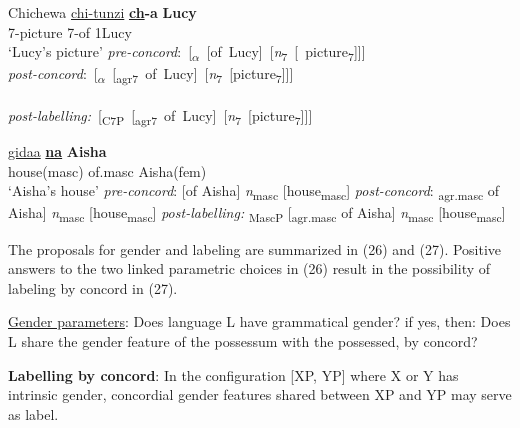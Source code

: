 \documentclass[output=paper
,modfonts
,nonflat]{langsci/langscibook}
\begin{document}
{\begin{exe} \settowidth{}
	\ex 
	\xlist
	\ex Chichewa \newline
	\gll \underline{chi-tunzi}    \textbf{\underline{ch}-a}  \textbf{Lucy} \\
	7-picture    7-of     1Lucy\\
	\glt `Lucy’s picture'  	
	\ex \mbox{\textit{pre-concord}:   [\textsubscript{$\alpha$} [of Lucy] [\textit{n}\textsubscript{7} [ picture\textsubscript{7}]]]}\\  
	\ex \mbox{\textit{post-concord}:   [\textsubscript{$\alpha$} [\textsubscript{agr7} of Lucy] [\textit{n}\textsubscript{7} [picture\textsubscript{7}]]]}\\  \\
	\ex \mbox{\textit{post-labelling:} [\textsubscript{C7P} [\textsubscript{agr7} of Lucy] [\textit{n}\textsubscript{7} [picture\textsubscript{7}]]]}\\ 
	\endxlist
\end{exe}
\begin{exe}
	\ex 
	\xlist
	\ex 
	\gll \underline{gidaa}    \textbf{\underline{na}}  \textbf{Aisha} \\
	house(masc)   of.masc   Aisha(fem)\\
	\glt `Aisha's house'  	
	\ex \textit{pre-concord}:   {\lbrack}[of Aisha] \textit{n}\textsubscript{masc} [house\textsubscript{masc}]{\rbrack}
	\ex \textit{post-concord}:   {\lbrack}\textsubscript{agr.masc} of Aisha] \textit{n}\textsubscript{masc} [house\textsubscript{masc}]{\rbrack}
	\ex \textit{post-labelling:} {\lbrack}\textsubscript{MascP} [\textsubscript{agr.masc} of Aisha] \textit{n}\textsubscript{masc} [house\textsubscript{masc}]{\rbrack}
	\endxlist
\end{exe}
The proposals for gender and labeling are summarized in (26) and (27). Positive answers to the two linked parametric choices in (26) result in the possibility of labeling by concord in (27). 

\begin{exe}
\ex \underline{Gender parameters}:
\xlist
\ex Does language L have grammatical gender? if yes, then:                   
\ex Does L share the gender feature of the possessum with the possessed, by concord?
\endxlist
\end{exe}
\begin{exe}
\ex 
\textbf{Labelling by concord}: In the configuration [XP, YP] where X or Y has intrinsic gender, concordial gender features shared between XP and YP may serve as label.
\end{exe}

}
\end{document}
